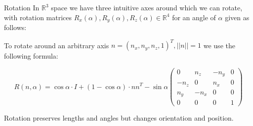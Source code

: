 \documentclass{panikzettel}
\begin{document}
\begin{defi}{Rotation}
In $\mathbb{R}^3$ space we have three intuitive axes around which we can rotate, with rotation matrices \linebreak $R_x(\alpha), R_y(\alpha), R_z(\alpha) \in \mathbb{R}^4$ for an angle of $\alpha$ given as follows:



To rotate around an arbitrary axis $n = (n_x,n_y,n_z,1)^T, ||n|| = 1$ we use the following formula:

$$R(n,\alpha) = \cos \alpha \cdot I + (1 - \cos \alpha) \cdot nn^T - \sin \alpha \begin{pmatrix}
0 & n_z & -n_y & 0 \\ -n_z & 0 & n_x & 0 \\ n_y & -n_x & 0 & 0 \\ 0 & 0 & 0 & 1
\end{pmatrix}$$
\end{defi}

Rotation preserves lengths and angles but changes orientation and position.
\end{document}
